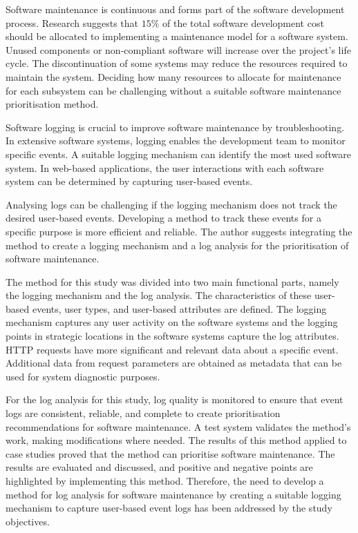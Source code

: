 Software maintenance is continuous and forms part of the software development process. Research suggests that $15\%$ of the total software development cost should be allocated to implementing a maintenance model for a software system. Unused components or non-compliant software will increase over the project's life cycle. The discontinuation of some systems may reduce the resources required to maintain the system. Deciding how many resources to allocate for maintenance for each subsystem can be challenging without a suitable software maintenance prioritisation method. \par Software logging is crucial to improve software maintenance by troubleshooting. In extensive software systems, logging enables the development team to monitor specific events. A suitable logging mechanism can identify the most used software system. In web-based applications, the user interactions with each software system can be determined by capturing user-based events. \par Analysing logs can be challenging if the logging mechanism does not track the desired user-based events. Developing a method to track these events for a specific purpose is more efficient and reliable. The author suggests integrating the method to create a logging mechanism and a log analysis for the prioritisation of software maintenance. \par The method for this study was divided into two main functional parts, namely the logging mechanism and the log analysis. The characteristics of these user-based events, user types, and user-based attributes are defined. The logging mechanism captures any user activity on the software systems and the logging points in strategic locations in the software systems capture the log attributes. HTTP requests have more significant and relevant data about a specific event. Additional data from request parameters are obtained as metadata that can be used for system diagnostic purposes. \par For the log analysis for this study, log quality is monitored to ensure that event logs are consistent, reliable, and complete to create prioritisation recommendations for software maintenance. A test system validates the method's work, making modifications where needed. The results of this method applied to case studies proved that the method can prioritise software maintenance. The results are evaluated and discussed, and positive and negative points are highlighted by implementing this method. Therefore, the need to develop a method for log analysis for software maintenance by creating a suitable logging mechanism to capture user-based event logs has been addressed by the study objectives.
